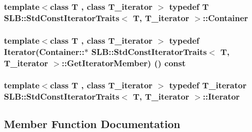 \subsubsection[{\texorpdfstring{Container}{Container}}]{\setlength{\rightskip}{0pt plus 5cm}template$<$class T , class T\+\_\+iterator $>$ typedef T {\bf S\+L\+B\+::\+Std\+Const\+Iterator\+Traits}$<$ T, T\+\_\+iterator $>$\+::{\bf Container}}\hypertarget{structSLB_1_1StdConstIteratorTraits_afb27a41e2ace9890da5c0f804ada7824}{}\label{structSLB_1_1StdConstIteratorTraits_afb27a41e2ace9890da5c0f804ada7824}
\subsubsection[{\texorpdfstring{Get\+Iterator\+Member}{GetIteratorMember}}]{\setlength{\rightskip}{0pt plus 5cm}template$<$class T , class T\+\_\+iterator $>$ typedef {\bf Iterator}(Container\+::$\ast$ {\bf S\+L\+B\+::\+Std\+Const\+Iterator\+Traits}$<$ T, T\+\_\+iterator $>$\+::Get\+Iterator\+Member) () const }\hypertarget{structSLB_1_1StdConstIteratorTraits_a35b71b2ca51d0a5369ad73453ad47a2d}{}\label{structSLB_1_1StdConstIteratorTraits_a35b71b2ca51d0a5369ad73453ad47a2d}
\subsubsection[{\texorpdfstring{Iterator}{Iterator}}]{\setlength{\rightskip}{0pt plus 5cm}template$<$class T , class T\+\_\+iterator $>$ typedef T\+\_\+iterator {\bf S\+L\+B\+::\+Std\+Const\+Iterator\+Traits}$<$ T, T\+\_\+iterator $>$\+::{\bf Iterator}}\hypertarget{structSLB_1_1StdConstIteratorTraits_a4ebb83cafbab2244e8eb2b2a8ceb40ac}{}\label{structSLB_1_1StdConstIteratorTraits_a4ebb83cafbab2244e8eb2b2a8ceb40ac}


\subsection{Member Function Documentation}
